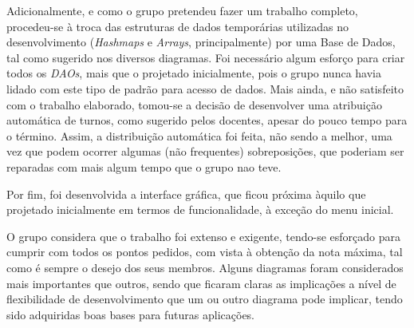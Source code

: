 \documentclass[a4paper]{article}
\begin{document}
Adicionalmente, e como o grupo pretendeu fazer um trabalho completo, procedeu-se à troca das estruturas de dados temporárias utilizadas no desenvolvimento (\textit{Hashmaps} e \textit{Arrays}, principalmente) por uma Base de Dados, tal como sugerido nos diversos diagramas. Foi necessário algum esforço para criar todos os \textit{DAOs}, mais que o projetado inicialmente, pois o grupo nunca havia lidado com este tipo de padrão para acesso de dados. Mais ainda, e não satisfeito com o trabalho elaborado, tomou-se a decisão de desenvolver uma atribuição automática de turnos, como sugerido pelos docentes, apesar do pouco tempo para o término. Assim, a distribuição automática foi feita, não sendo a melhor, uma vez que podem ocorrer algumas (não frequentes) sobreposições, que poderiam ser reparadas com mais algum tempo que o grupo nao teve.

Por fim, foi desenvolvida a interface gráfica, que ficou próxima àquilo que projetado inicialmente em termos de funcionalidade, à exceção do menu inicial.

O grupo considera que o trabalho foi extenso e exigente, tendo-se esforçado para cumprir com todos os pontos pedidos, com vista à obtenção da nota máxima, tal como é sempre o desejo dos seus membros. Alguns diagramas foram considerados mais importantes que outros, sendo que ficaram claras as implicações a nível de flexibilidade de desenvolvimento que um ou outro diagrama pode implicar, tendo sido adquiridas boas bases para futuras aplicações.
\label{sec:4}

\hspace{3mm}
\end{document}
